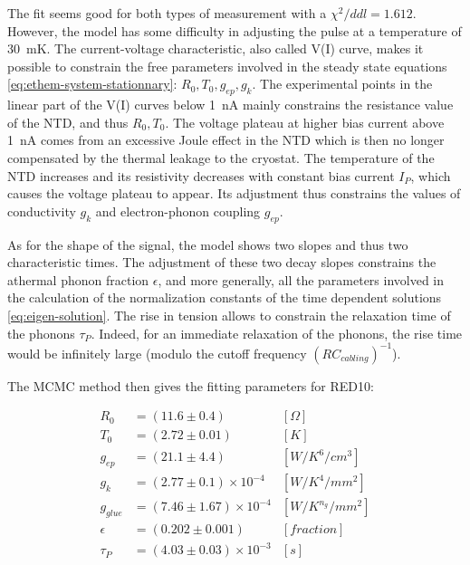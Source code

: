 The fit seems good for both types of measurement with a $\chi^2/ddl=1.612$. However, the model has some difficulty in adjusting the pulse at a temperature of \SI{30}{\milli\kelvin}. The current-voltage characteristic, also called V(I) curve, makes it possible to constrain the free parameters involved in the steady state equations \ref{eq:ethem-system-stationnary}: $R_0, T_0, g_{ep}, g_k$. The experimental points in the linear part of the V(I) curves below \SI{1}{\nano\ampere} mainly constrains the resistance value of the NTD, and thus $R_0, T_0$. The voltage plateau at higher bias current above \SI{1}{\nano\ampere} comes from an excessive Joule effect in the NTD which is then no longer compensated by the thermal leakage to the cryostat. The temperature of the NTD increases and its resistivity decreases with constant bias current $I_P$, which causes the voltage plateau to appear. Its adjustment thus constrains the values of conductivity $g_k$ and electron-phonon coupling $g_{ep}$.

As for the shape of the signal, the model shows two slopes and thus two characteristic times. The adjustment of these two decay slopes constrains the athermal phonon fraction $\epsilon$, and more generally, all the parameters involved in the calculation of the normalization constants of the time dependent solutions \ref{eq:eigen-solution}.
The rise in tension allows to constrain the relaxation time of the phonons $\tau_P$. Indeed, for an immediate relaxation of the phonons, the rise time would be infinitely large (modulo the cutoff frequency $(RC_{cabling})^{-1}$).

The MCMC method then gives the fitting parameters for RED10:

\begin{align}
R_0 &= (11.6 \pm 0.4)&[\Omega] \\
T_0 &= (2.72 \pm 0.01) &[K] \\
g_{ep} &= (21.1 \pm 4.4) &[W/K^6/cm^3] \\
g_k &= (2.77 \pm 0.1) \times 10^{-4}&[W/K^4/mm^2] \\
g_{glue} &= (7.46 \pm 1.67) \times 10^{-4} &[W/K^{n_g}/mm^2] \\
\epsilon &= (0.202 \pm 0.001)  & [fraction]\\
\tau_P &= (4.03 \pm 0.03) \times 10^{-3} &[s]
\end{align}

